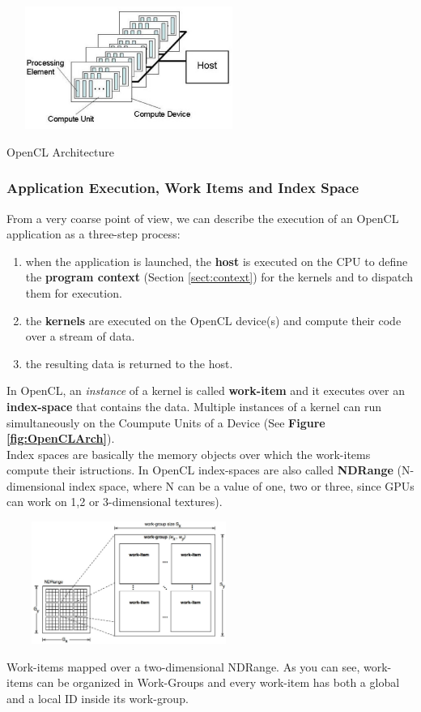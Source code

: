 \begin{figurehere}
 \centering
 \includegraphics[width=8cm, height=4cm]{./eps/OpenCLArch.eps}
 \caption{OpenCL Architecture}
 \label{fig:OpenCLArch}
\end{figurehere}



\subsubsection{Application Execution, Work Items and Index Space}

From a very coarse point of view, we can describe the execution of an OpenCL application as a three-step process:

\begin{enumerate}
	\item when the application is launched, the \textbf{host} is executed on the CPU to define the \textbf{program context} (Section \ref{sect:context}) for the kernels and to dispatch them for execution.
	\item the \textbf{kernels} are executed on the OpenCL device(s) and compute their code over a stream of data.
	\item the resulting data is returned to the host.
\end{enumerate}

In OpenCL, an \emph{instance} of a kernel is called \textbf{work-item} and it executes over an \textbf{index-space} that contains the data. Multiple instances of a kernel can run simultaneously on the Coumpute Units of a Device (See \textbf{Figure \ref{fig:OpenCLArch}}).\\ Index spaces are basically the memory objects over which the work-items compute their istructions. In OpenCL index-spaces are also called \textbf{NDRange} (N-dimensional index space, where N can be a value of one, two or three, since GPUs can work on 1,2 or 3-dimensional textures).\\

\begin{figurehere}
 \centering
 \includegraphics[width=8cm, height=4cm]{./eps/index-space.eps}
 \caption{Work-items mapped over a two-dimensional NDRange. As you can see, work-items can be organized in Work-Groups and every work-item has both a global and a local ID inside its work-group.}
 \label{fig:indexSpace}
\end{figurehere}

